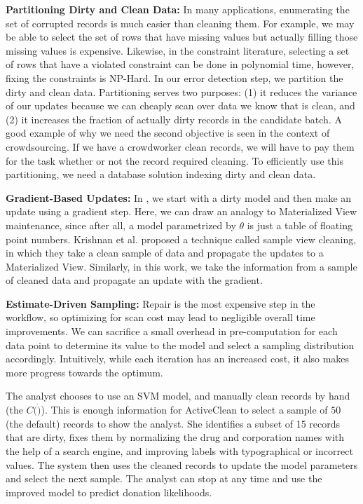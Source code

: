 \vspace{0.5em}

\noindent\textbf{Partitioning Dirty and Clean Data: } In many applications, enumerating the set of corrupted records is much easier than cleaning them. For example, we may be able to select the set of rows that have missing values but actually filling those missing values is expensive. Likewise, in the constraint literature, selecting a set of rows that have a violated constraint can be done in polynomial time, however, fixing the constraints is NP-Hard.
In our error detection step, we partition the dirty and clean data.
Partitioning serves two purposes: (1) it reduces the variance of our updates because we can cheaply scan over data we know that is clean, and (2) it increases the fraction of actually dirty records in the candidate batch.
A good example of why we need the second objective is seen in the context of crowdsourcing.
If we have a crowdworker clean records, we will have to pay them for the task whether or not the record required cleaning.
To efficiently use this partitioning, we need a database solution indexing dirty and clean data.

\vspace{0.5em}

\noindent\textbf{Gradient-Based Updates: } In \sys, we start with a dirty model and then make an update using a gradient step. Here, we can draw an analogy to Materialized View maintenance, since after all, a model parametrized by $\theta$ is just a table of floating point numbers.
Krishnan et al. proposed a technique called sample view cleaning, in which they take a clean sample of data and propagate the updates to a Materialized View.
Similarly, in this work, we take the information from a sample of cleaned data and propagate an update with the gradient.

\vspace{0.5em}

\noindent\textbf{Estimate-Driven Sampling: } Repair is the most expensive step in the workflow, so optimizing for scan cost may lead to negligible overall time improvements.
We can sacrifice a small overhead in pre-computation for each data point to determine its value to the model and select a sampling distribution accordingly.
Intuitively, while each iteration has an increased cost, it also makes more progress towards the optimum.


\begin{example}\label{archex1}
The analyst chooses to use an SVM model, and manually clean records by hand (the $C(\dot)$).  
This is enough information for ActiveClean to select a sample of $50$ (the default) records to show the analyst.
She identifies a subset of 15 records that are dirty, fixes them by normalizing the drug and corporation names with the help of a search engine, and improving labels with typographical or incorrect values.
The system then uses the cleaned records to update the model parameters and select the next sample.
The analyst can stop at any time and use the improved model to predict donation likelihoods.
\end{example}
\fi


